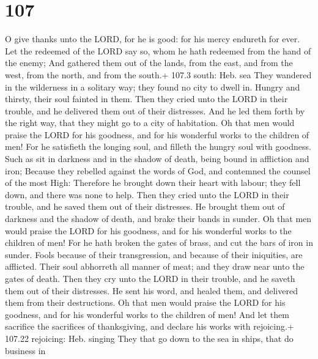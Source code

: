 \hypertarget{section-106}{%
\section{107}\label{section-106}}

 O give thanks unto the LORD, for he is good: for his mercy
endureth for ever.  Let the redeemed of the LORD say so,
whom he hath redeemed from the hand of the enemy;  And
gathered them out of the lands, from the east, and from the west, from
the north, and from the south.+ 107.3 south: Heb. sea  They
wandered in the wilderness in a solitary way; they found no city to
dwell in.  Hungry and thirsty, their soul fainted in them.
 Then they cried unto the LORD in their trouble, and he
delivered them out of their distresses.  And he led them
forth by the right way, that they might go to a city of habitation.
 Oh that men would praise the LORD for his goodness, and for
his wonderful works to the children of men!  For he
satisfieth the longing soul, and filleth the hungry soul with goodness.
 Such as sit in darkness and in the shadow of death, being
bound in affliction and iron;  Because they rebelled
against the words of God, and contemned the counsel of the most High:
 Therefore he brought down their heart with labour; they
fell down, and there was none to help.  Then they cried
unto the LORD in their trouble, and he saved them out of their
distresses.  He brought them out of darkness and the shadow
of death, and brake their bands in sunder.  Oh that men
would praise the LORD for his goodness, and for his wonderful works to
the children of men!  For he hath broken the gates of
brass, and cut the bars of iron in sunder.  Fools because
of their transgression, and because of their iniquities, are afflicted.
 Their soul abhorreth all manner of meat; and they draw
near unto the gates of death.  Then they cry unto the LORD
in their trouble, and he saveth them out of their distresses.
 He sent his word, and healed them, and delivered them from
their destructions.  Oh that men would praise the LORD for
his goodness, and for his wonderful works to the children of men!
 And let them sacrifice the sacrifices of thanksgiving, and
declare his works with rejoicing.+ 107.22 rejoicing: Heb. singing
 They that go down to the sea in ships, that do business in
